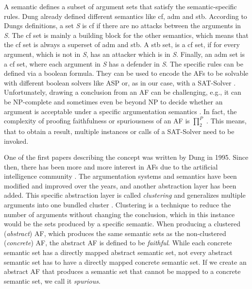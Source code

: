 A semantic defines a subset of argument sets that satisfy the semantic-specific rules. Dung already defined different semantics \cite{Dung1995-DUNOTA-2} like \ac{cf}, \ac{adm} and \ac{stb}. According to Dungs definitions, a set \textit{S} is \ac{cf} if there are no attacks between the arguments in \textit{S}. The \ac{cf} set is mainly a building block for the other semantics, which means that the \ac{cf} set is always a superset of \ac{adm} and \ac{stb}. 
A \ac{stb} set, is a \ac{cf} set, if for every argument, which is not in \textit{S}, has an attacker which is in \textit{S}. 
Finally, an \ac{adm} set is a \ac{cf} set, where each argument in \textit{S} has a defender in \textit{S}. 
The specific rules can be defined via a boolean formula. They can be used to encode the \acp{AF} to be solvable with different boolean solvers like \ac{ASP} \cite{DBLP:journals/corr/abs-1301-1388} or, as in our case, with a \ac{SAT-Solver} \cite{DBLP:journals/amai/AmgoudD13}. Unfortunately, drawing a conclusion from an AF can be challenging, e.g., it can be NP-complete and sometimes even be beyond NP to decide whether an argument is acceptable under a specific argumentation semantics \cite{DBLP:journals/ai/DvorakGRW23}. In fact, the complexity of proofing faithfulness or spuriousness of an \ac{AF} is $\prod_2^P$ \cite{DBLP:conf/kr/SaribaturW21}. This means, that to obtain a result, multiple instances or calls of a SAT-Solver need to be invoked. 


One of the first papers describing the concept was written by Dung \cite{Dung1995-DUNOTA-2} in 1995. Since then, there has been more and more interest in \acp{AF} due to the artificial intelligence community \cite{DBLP:books/ox/22/CocarascuC0T22}. The argumentation systems and semantics have been modified and improved over the years, and another abstraction layer has been added. This specific abstraction layer is called \emph{clustering} and generalizes multiple arguments into one bundled cluster \cite{DBLP:conf/kr/SaribaturW21}. Clustering is a technique to reduce the number of arguments without changing the conclusion, which in this instance would be the sets produced by a specific semantic. When producing a clustered (\emph{abstract}) \ac{AF}, which produces the same semantic sets as the non-clustered (\emph{concrete}) \ac{AF}, the abstract \ac{AF} is defined to be \emph{faithful}. While each concrete semantic set has a directly mapped abstract semantic set, not every abstract semantic set has to have a directly mapped concrete semantic set. If we create an abstract \ac{AF} that produces a semantic set that cannot be mapped to a concrete semantic set, we call it \emph{spurious}.



